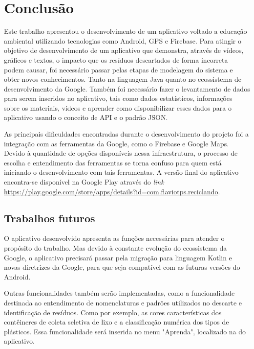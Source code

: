 \documentclass[
	12pt,				%
	openany,			%
	twoside,			%
	a4paper,			%
	english,			%
	french,				%
	spanish,			%
	brazil				%
	]{abntex2}
\begin{document}
\chapter{Conclusão}
Este trabalho apresentou o desenvolvimento de um aplicativo voltado a educação ambiental utilizando tecnologias como Android, GPS e Firebase. Para atingir o objetivo de desenvolvimento de um aplicativo que demonstra, através de vídeos, gráficos e textos, o impacto que os resíduos descartados de forma incorreta podem causar, foi necessário passar pelas etapas de modelagem do sistema e obter novos conhecimentos. Tanto na linguagem Java quanto no ecossistema de desenvolvimento da Google. Também foi necessário fazer o levantamento de dados para serem inseridos no aplicativo, tais como dados estatísticos, informações sobre os materiais, vídeos e aprender como disponibilizar esses dados para o aplicativo usando o conceito de API e o padrão JSON.

As principais dificuldades encontradas durante o desenvolvimento do projeto foi a integração com as ferramentas da Google, como o Firebase e Google Maps. Devido à quantidade de opções disponíveis nessa infraestrutura, o processo de escolha e entendimento das ferramentas se torna confuso para quem está iniciando o desenvolvimento com tais ferramentas.
A versão final do aplicativo encontra-se disponível na Google Play através do \textit{link} \href{https://play.google.com/store/apps/details?id=com.flaviotps.reciclando}{https://play.google.com/store/apps/details?id=com.flaviotps.reciclando}.

\section{Trabalhos futuros}
O aplicativo desenvolvido apresenta as funções necessárias para atender o propósito do trabalho. Mas devido à constante evolução do ecossistema da Google, o aplicativo precisará passar pela migração para linguagem Kotlin e novas diretrizes da Google, para que seja compatível com as futuras versões do Android.

Outras funcionalidades também serão implementadas, como a funcionalidade destinada ao entendimento de nomenclaturas e padrões utilizados no descarte e identificação de resíduos. Como por exemplo, as cores características dos contêineres de coleta seletiva de lixo e a classificação numérica dos tipos de plásticos. 
Essa funcionalidade será inserida no menu "Aprenda", localizado na  do aplicativo.
\end{document}
